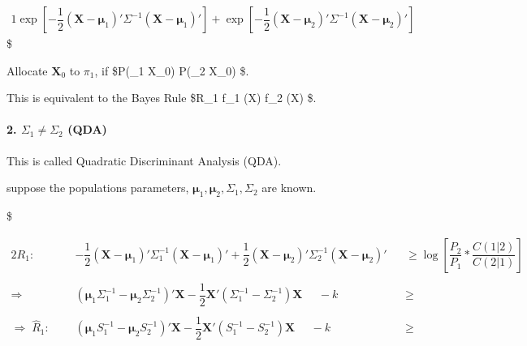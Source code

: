 \documentclass[
]{book}
\begin{document}
{{{\begin{alignat*}{1}
{\exp \left[ - \dfrac {1}{2} (\pmb X - \pmb \mu_1)' \Sigma^{-1} (\pmb X - \pmb \mu_1)'\right] + 
\exp \left[ - \dfrac {1}{2} (\pmb X - \pmb \mu_2)' \Sigma^{-1} (\pmb X - \pmb \mu_2)'\right]}


\end{alignat*}
\$

Allocate \(\pmb X_0\) to \(\pi_1\), if \$P(\pi\_1 \vert \pmb X\_0) \ge P(\pi\_2 \vert \pmb X\_0) \$.

This is equivalent to the Bayes Rule \$R\_1 \colon f\_1 (\pmb X) \ge f\_2 (\pmb X) \$.

\hypertarget{sigma_1-not-sigma_2-qda}{%
\paragraph{\texorpdfstring{2. \(\Sigma_1 \not = \Sigma_2\) (QDA)}{2. \textbackslash Sigma\_1 \textbackslash not = \textbackslash Sigma\_2 (QDA)}}\label{sigma_1-not-sigma_2-qda}}

This is called Quadratic Discriminant Analysis (QDA).

suppose the populations parameters, \(\pmb \mu_1, \pmb \mu_2, \Sigma_1, \Sigma_2\) are known.

\$

\begin{alignat*}{2}


R_1 \colon \; &-\dfrac {1} {2} (\pmb X - \pmb \mu_1)' \Sigma_1^{-1} (\pmb X - \pmb \mu_1)' +\dfrac {1} {2} (\pmb X - \pmb \mu_2)' \Sigma_2^{-1} (\pmb X - \pmb \mu_2)'&

&\ge \log \left[ \dfrac {P_2}{P_1} \ast \dfrac {C(1\vert2)}{C(2\vert1)} \right] 

\\
\\


\Rightarrow \; \; \; \; \;

&(\pmb \mu_1 \Sigma_1 ^{-1} - \pmb \mu_2 \Sigma_2 ^{-1} )'  \pmb X - \dfrac {1}{2} \pmb X ' (\Sigma_1^{-1} - \Sigma_2^{-1} ) \pmb X \; \; \; \; \; -k&

&\ge  \tag{3}


\\
\\

\Rightarrow \; \hat R_1 \colon \; \; \; \; \;

&(\pmb \mu_1 S_1 ^{-1} - \pmb \mu_2 S_2 ^{-1} )'  \pmb X - \dfrac {1}{2} \pmb X ' (S_1^{-1} - S_2^{-1} ) \pmb X \; \; \; \; \; - k&

&\ge 






\end{alignat*}}}}
\end{document}
